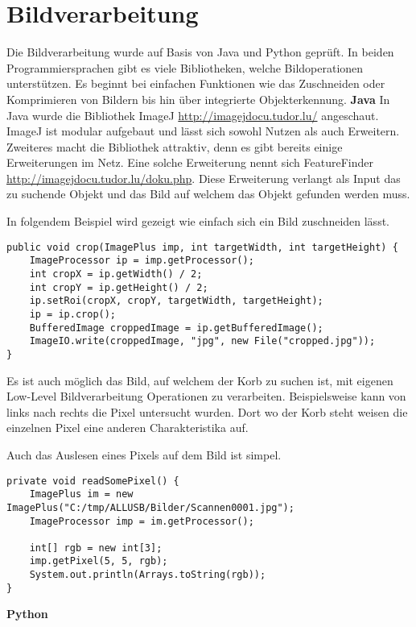 \section{Bildverarbeitung}
\label{anhang-bildverarbeitung}
Die Bildverarbeitung wurde auf Basis von Java und Python geprüft. In beiden Programmiersprachen gibt es viele Bibliotheken, welche Bildoperationen unterstützen. Es beginnt bei einfachen Funktionen wie das Zuschneiden oder Komprimieren von Bildern bis hin über integrierte Objekterkennung.\newline
\newline
\textbf{Java}\newline
In Java wurde die Bibliothek ImageJ \href{http://imagejdocu.tudor.lu/}{http://imagejdocu.tudor.lu/} angeschaut. ImageJ ist modular aufgebaut und lässt sich sowohl Nutzen als auch Erweitern. Zweiteres macht die Bibliothek attraktiv, denn es gibt bereits einige Erweiterungen im Netz. Eine solche Erweiterung nennt sich FeatureFinder \href{http://imagejdocu.tudor.lu/doku.php?id=plugin:analysis:feature_finder:start}{http://imagejdocu.tudor.lu/doku.php}. Diese Erweiterung verlangt als Input das zu suchende Objekt und das Bild auf welchem das Objekt gefunden werden muss. \newline
\newline

In folgendem Beispiel wird gezeigt wie einfach sich ein Bild zuschneiden lässt.
\begin{lstlisting}
public void crop(ImagePlus imp, int targetWidth, int targetHeight) {
	ImageProcessor ip = imp.getProcessor();
	int cropX = ip.getWidth() / 2;
	int cropY = ip.getHeight() / 2;
	ip.setRoi(cropX, cropY, targetWidth, targetHeight);
	ip = ip.crop();
	BufferedImage croppedImage = ip.getBufferedImage();
	ImageIO.write(croppedImage, "jpg", new File("cropped.jpg"));
}
\end{lstlisting}

Es ist auch möglich das Bild, auf welchem der Korb zu suchen ist, mit eigenen Low-Level Bildverarbeitung Operationen zu verarbeiten. Beispielsweise kann von links nach rechts die Pixel untersucht wurden. Dort wo der Korb steht weisen die einzelnen Pixel eine anderen Charakteristika auf.

Auch das Auslesen eines Pixels auf dem Bild ist simpel.
\begin{lstlisting}
private void readSomePixel() {
	ImagePlus im = new ImagePlus("C:/tmp/ALLUSB/Bilder/Scannen0001.jpg");
	ImageProcessor imp = im.getProcessor();

	int[] rgb = new int[3];
	imp.getPixel(5, 5, rgb);
	System.out.println(Arrays.toString(rgb));
}
\end{lstlisting}


\textbf{Python}


